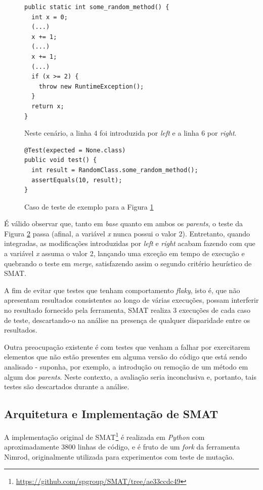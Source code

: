 \documentclass[12pt]{article}
\begin{document}
\begin{figure}[H]
\begin{verbatim}
public static int some_random_method() {
  int x = 0;
  (...)
  x += 1;
  (...)
  x += 1;
  (...)
  if (x >= 2) {
    throw new RuntimeException();
  }
  return x;
}
\end{verbatim}
\caption{Neste cenário, a linha 4 foi introduzida por \textit{left} e a linha 6 por \textit{right}.}
\label{fig:segundo-criterio}
\end{figure}

\begin{figure}[H]
\begin{verbatim}
@Test(expected = None.class)
public void test() {
  int result = RandomClass.some_random_method();
  assertEquals(10, result);
}
\end{verbatim}
\caption{Caso de teste de exemplo para a Figura \ref{fig:segundo-criterio}}
\label{fig:segundo-criterio-teste}
\end{figure}

É válido observar que, tanto em \textit{base} quanto em ambos os \textit{parents}, o teste da Figura \ref{fig:segundo-criterio-teste} passa (afinal, a variável \textit{x} nunca possui o valor 2). Entretanto, quando integradas, as modificações introduzidas por \textit{left} e \textit{right} acabam fazendo com que a variável \textit{x} assuma o valor 2, lançando uma exceção em tempo de execução e quebrando o teste em \textit{merge}, satisfazendo assim o segundo critério heurístico de SMAT.
 
A fim de evitar que testes que tenham comportamento \textit{flaky}, isto é, que não apresentam resultados consistentes ao longo de várias execuções, possam interferir no resultado fornecido pela ferramenta, SMAT realiza 3 execuções de cada caso de teste, descartando-o na análise na presença de qualquer disparidade entre os resultados.

Outra preocupação existente é com testes que venham a falhar por exercitarem elementos que não estão presentes em alguma versão do código que está sendo analisado - suponha, por exemplo, a introdução ou remoção de um método em algum dos \textit{parents}. Neste contexto, a avaliação seria inconclusiva e, portanto, tais testes são descartados durante a análise.

\subsection{Arquitetura e Implementação de SMAT}
A implementação original de SMAT\footnote{\href{https://github.com/spgroup/SMAT/tree/ae33ccdc49}{https://github.com/spgroup/SMAT/tree/ae33ccdc49}} é realizada em \textit{Python} com aproximadamente 3800 linhas de código, e é fruto de um \textit{fork} da ferramenta Nimrod, originalmente utilizada para experimentos com teste de mutação.
\end{document}
